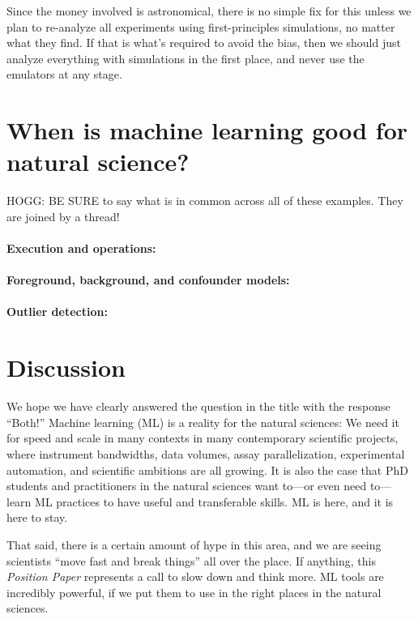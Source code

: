 \documentclass[11pt]{article}
\newcommand{\documentname}{\textsl{Position Paper}}
\begin{document}
Since the money involved is astronomical, there is no simple fix for this unless we plan to re-analyze all experiments using first-principles simulations, no matter what they find.
If that is what's required to avoid the bias, then we should just analyze everything with simulations in the first place, and never use the emulators at any stage.

\section{When is machine learning good for natural science?}\label{sec:good}
HOGG: BE SURE to say what is in common across all of these examples. They are joined by a thread!

\paragraph{Execution and operations:}

\paragraph{Foreground, background, and confounder models:}

\paragraph{Outlier detection:}

\section{Discussion}\label{sec:discussion}

We hope we have clearly answered the question in the title with the response ``Both!''
Machine learning (ML) is a reality for the natural sciences:
We need it for speed and scale in many contexts in many contemporary scientific projects, where instrument bandwidths, data volumes, assay parallelization, experimental automation, and scientific ambitions are all growing.
It is also the case that PhD students and practitioners in the natural sciences want to---or even need to---learn ML practices to have useful and transferable skills.
ML is here, and it is here to stay.

That said, there is a certain amount of hype in this area, and we are seeing scientists ``move fast and break things'' \cite{zuck} all over the place.
If anything, this \documentname{} represents a call to slow down and think more.
ML tools are incredibly powerful, if we put them to use in the right places in the natural sciences.
\end{document}
